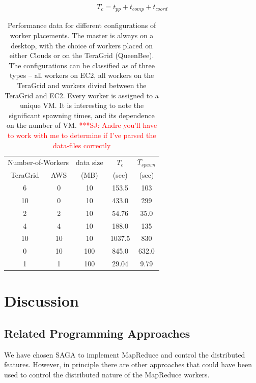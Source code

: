 \documentclass[conference,final]{IEEEtran}
\newcommand{\jhanote}[1]{ {\textcolor{red} { ***SJ: #1 }}}
\newcommand{\jhanote}[1]{}
\newcommand{\upp}{\vspace*{-0.5em}}
\begin{document}
\vspace{-1em}
\begin{eqnarray}
T_c = t_{pp} + t_{comp} + t_{coord}
\end{eqnarray}



\begin{table}
\upp
\begin{tabular}{ccccc}
  \hline
  \multicolumn{2}{c}{Number-of-Workers}  &  data size   &  $T_c$  & $T_{spawn}$ \\   
  TeraGrid &  AWS &   (MB)  & (sec) & (sec)  \\
  \hline
  6 & 0 & 10   &  153.5 & 103  \\
  10 & 0 & 10  &  433.0  & 299 \\
  2 & 2 & 10 & 54.76 & 35.0 \\
  4 & 4 &10 & 188.0 & 135 \\
  10 & 10 & 10 & 1037.5 & 830 \\
  \hline
  0 & 10 & 100 &  845.0 & 632.0 \\
  1 & 1 & 100 & 29.04 & 9.79 \\
  \hline \hline
\end{tabular}
\upp
\caption{Performance data for different configurations of worker placements. The master is always on a desktop, with the choice of workers placed on either Clouds or on the TeraGrid (QueenBee). The configurations can be classified
  as of three types -- all workers on EC2, all workers on the TeraGrid and workers divied between the TeraGrid and EC2. Every worker is assigned to a unique
  VM. It is interesting to note the significant
  spawning times, and its dependence on the number of VM. \jhanote{Andre you'll have to work with me to determine if I've parsed the data-files correctly} }
\label{stuff}
\upp
\upp
\end{table}

\section{Discussion}

\subsection*{Related Programming Approaches}

We have chosen SAGA to implement MapReduce and control the distributed
features. However, in principle there are other approaches that could
have been used to control the distributed nature of the MapReduce
workers.
\end{document}
